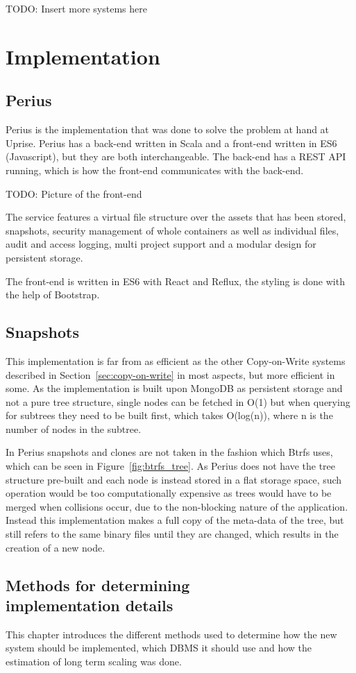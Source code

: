 \documentclass[a4paper,12pt]{article}
\begin{document}
TODO: Insert more systems here
\section{Implementation}
\subsection{Perius}
Perius is the implementation that was done to solve the problem at hand at Uprise. Perius has a
back-end written in Scala and a front-end written in ES6 (Javascript), but they are both interchangeable. 
The back-end has a REST API running, which is how the front-end communicates with the back-end.

TODO: Picture of the front-end

The service features a virtual file structure over the assets that has been stored, snapshots,
security management of whole containers as well as individual files, audit and access logging, multi
project support and a modular design for persistent storage.

The front-end is written in ES6 with React and Reflux, the styling is done with the help of
Bootstrap.

\subsection{Snapshots}
This implementation is far from as 
efficient as the other Copy-on-Write systems described in Section~\ref{sec:copy-on-write} in most aspects, but more efficient 
in some. As the implementation is built upon MongoDB as persistent storage and not a pure tree structure, single nodes 
can be fetched in O(1) but when querying for subtrees they need to be built first, which takes O(log(n)), where n is the 
number of nodes in the subtree. 

In Perius snapshots and clones are not taken in the fashion which Btrfs uses, which can be seen in 
Figure~\ref{fig:btrfs_tree}. As Perius does not have the tree structure pre-built and each node is instead stored in a 
flat storage space, such operation would be too computationally expensive as trees would have to be merged when 
collisions occur, due to the non-blocking nature of the application. Instead this implementation makes a full copy of 
the meta-data of the tree, but still refers to the same binary files until they are changed, which results in the 
creation of a new node.

\subsection{Methods for determining\\implementation details}
This chapter introduces the different methods used to determine how the new system should be implemented, 
which DBMS it should use and how the estimation of long term scaling was done.
\end{document}
